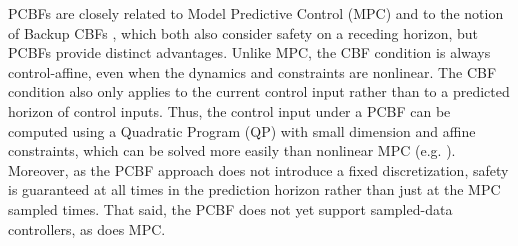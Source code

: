 \documentclass[10pt,conference]{ieeeconf}
\renewcommand{\(}{\left(}
\renewcommand{\)}{\right)}
\renewcommand{\[}{\left[}
\renewcommand{\]}{\right]}
\newcommand{\extendedversion}[1]{{\color{black}#1}}
\begin{document}
PCBFs are closely related to Model Predictive Control (MPC) \cite{mpc_with_backup_aircraft,multirate_design_cbfs_mpc,Discrete_MPC_CBFs,chemical_control_mpc_cbf,multilayer_icra,discrete_backup_cbf} and to the notion of Backup CBFs \cite{Predictive_CBF,backup_controller,backup_control_multi_robot,CDC21,backup_tutorial,discrete_backup_cbf}, which both also consider safety on a receding horizon, but PCBFs provide distinct advantages. 
Unlike MPC, the CBF condition is always control-affine, even when the dynamics and constraints are nonlinear. The CBF condition also only applies to the current control input rather than to a predicted horizon of control inputs. Thus, the control input under a PCBF can be computed using a Quadratic Program (QP) with small dimension and affine constraints, which can be solved more easily than nonlinear MPC (e.g. \cite{Discrete_MPC_CBFs,multilayer_icra}). Moreover, as the PCBF approach does not introduce a fixed discretization, safety is guaranteed at all times in the prediction horizon rather than just at the MPC sampled times.\extendedversion{{} That said, the PCBF does not yet support sampled-data controllers, as does MPC.}

%
\end{document}
